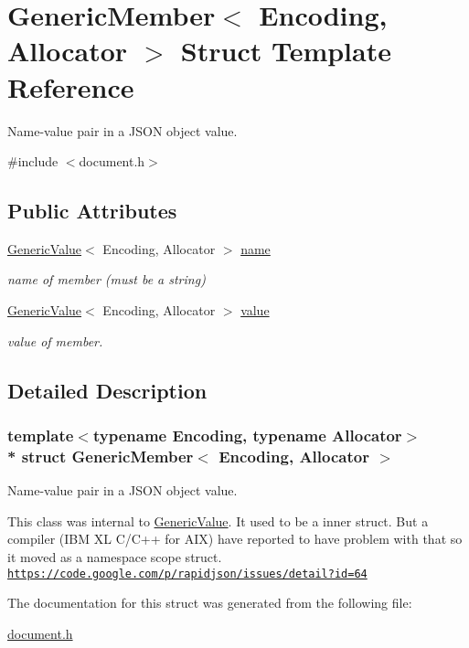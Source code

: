 \hypertarget{a00117}{}\section{Generic\+Member$<$ Encoding, Allocator $>$ Struct Template Reference}
\label{a00117}


Name-\/value pair in a J\+S\+ON object value.  




{\ttfamily \#include $<$document.\+h$>$}

\subsection*{Public Attributes}
\begin{DoxyCompactItemize}
\item 
\hyperlink{a00130}{Generic\+Value}$<$ Encoding, Allocator $>$ \hyperlink{a00117_a7124f7ccd67421533d33139938604fac}{name}\hypertarget{a00117_a7124f7ccd67421533d33139938604fac}{}\label{a00117_a7124f7ccd67421533d33139938604fac}

\begin{DoxyCompactList}\small\item\em name of member (must be a string) \end{DoxyCompactList}\item 
\hyperlink{a00130}{Generic\+Value}$<$ Encoding, Allocator $>$ \hyperlink{a00117_aad3cfa4f9e8b9018068c8bc865723083}{value}\hypertarget{a00117_aad3cfa4f9e8b9018068c8bc865723083}{}\label{a00117_aad3cfa4f9e8b9018068c8bc865723083}

\begin{DoxyCompactList}\small\item\em value of member. \end{DoxyCompactList}\end{DoxyCompactItemize}


\subsection{Detailed Description}
\subsubsection*{template$<$typename Encoding, typename Allocator$>$\\*
struct Generic\+Member$<$ Encoding, Allocator $>$}

Name-\/value pair in a J\+S\+ON object value. 

This class was internal to \hyperlink{a00130}{Generic\+Value}. It used to be a inner struct. But a compiler (I\+BM XL C/\+C++ for A\+IX) have reported to have problem with that so it moved as a namespace scope struct. \href{https://code.google.com/p/rapidjson/issues/detail?id=64}{\tt https\+://code.\+google.\+com/p/rapidjson/issues/detail?id=64} 

The documentation for this struct was generated from the following file\+:\begin{DoxyCompactItemize}
\item 
\hyperlink{a00473}{document.\+h}\end{DoxyCompactItemize}
